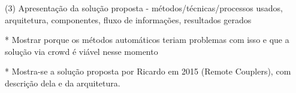 (3) Apresentação da solução proposta - métodos/técnicas/processos usados, arquitetura,
componentes, fluxo de informações, resultados gerados

* Mostrar porque os métodos automáticos teriam problemas com isso e que a solução via crowd é viável nesse momento
 
* Mostra-se a solução proposta por Ricardo em 2015 (Remote Couplers), com descrição dela e da arquitetura.